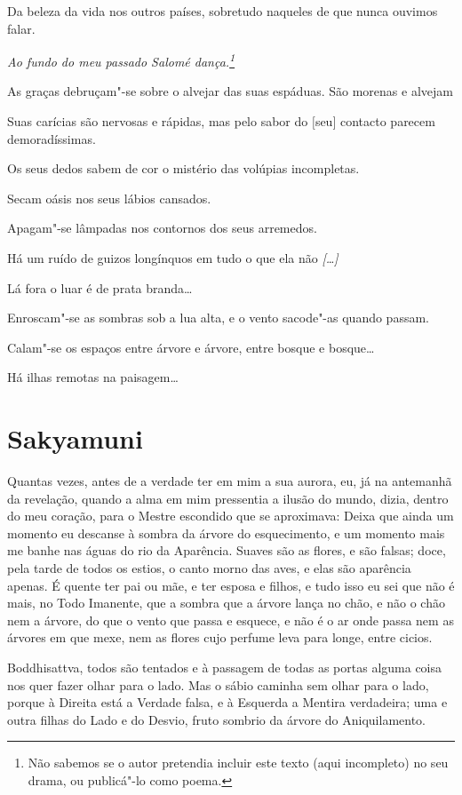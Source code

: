 Da beleza da vida nos outros países, sobretudo naqueles de que nunca
ouvimos falar.

\asterisc 

{\itshape
Ao fundo do meu passado Salomé dança.\footnote{ Não sabemos
se o autor pretendia incluir este texto (aqui incompleto) no seu
drama, ou publicá"-lo como poema.}

As graças debruçam"-se sobre o alvejar das suas espáduas. 
São morenas e alvejam 

Suas carícias são nervosas e rápidas, mas pelo sabor do $[$seu$]$
contacto parecem demoradíssimas.

Os seus dedos sabem de cor o mistério das volúpias incompletas.

Secam oásis nos seus lábios cansados. 

Apagam"-se lâmpadas nos contornos dos seus arremedos. 

Há um ruído de guizos longínquos em tudo o que ela não \emph{[\ldots{}]}

Lá fora o luar é de prata branda\ldots{} 

Enroscam"-se as sombras sob a lua alta, e o vento sacode"-as
quando passam. 

Calam"-se os espaços entre árvore e árvore, entre bosque e
bosque\ldots{} 

Há ilhas remotas na paisagem\ldots{} 
}

\chapter{Sakyamuni}

 Quantas vezes, antes de a verdade ter em mim a sua aurora,
eu, já na antemanhã da revelação, quando a alma em mim pressentia a
ilusão do mundo, dizia, dentro do meu coração, para o Mestre
escondido que se aproximava: Deixa que ainda um momento eu descanse à
sombra da árvore do esquecimento, e um momento mais me banhe nas
águas do rio da Aparência. Suaves são as flores, e são falsas; doce,
pela tarde de todos os estios, o canto morno das aves, e elas são
aparência apenas. É quente ter pai ou mãe, e ter esposa e filhos, e
tudo isso eu sei que não é mais, no Todo Imanente, que a sombra que a
árvore lança no chão, e não o chão nem a árvore, do que o vento que
passa e esquece, e não é o ar onde passa nem as árvores em que mexe,
nem as flores cujo perfume leva para longe, entre cicios.

 Boddhisattva, todos são tentados e à passagem de todas as
portas alguma coisa nos quer fazer olhar para o lado. Mas o sábio
caminha sem olhar para o lado, porque à Direita está a Verdade falsa,
e à Esquerda a Mentira verdadeira; uma e outra filhas do Lado e do
Desvio, fruto sombrio da árvore do Aniquilamento.

